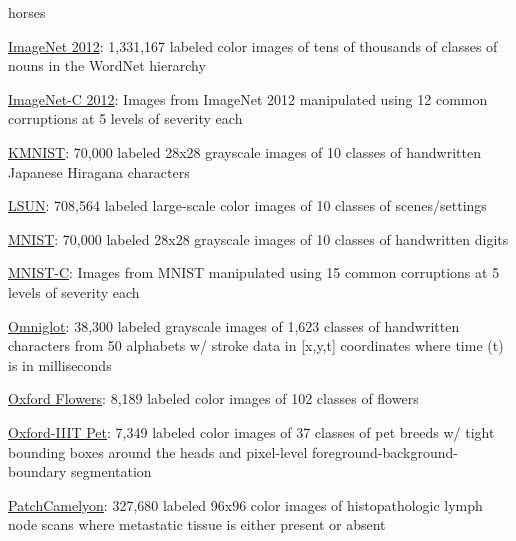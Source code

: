 \documentclass{tufte-handout}
\begin{document}
  horses
\item
  \href{https://github.com/tensorflow/datasets/blob/master/docs/datasets.md\#imagenet2012}{ImageNet
  2012}: 1,331,167 labeled color images of tens of thousands of classes
  of nouns in the WordNet hierarchy
\item
  \href{https://github.com/tensorflow/datasets/blob/master/docs/datasets.md\#imagenet2012_corrupted}{ImageNet-C
  2012}: Images from ImageNet 2012 manipulated using 12 common
  corruptions at 5 levels of severity each
\item
  \href{https://github.com/tensorflow/datasets/blob/master/docs/datasets.md\#kmnist}{KMNIST}:
  70,000 labeled 28x28 grayscale images of 10 classes of handwritten
  Japanese Hiragana characters
\item
  \href{https://github.com/tensorflow/datasets/blob/master/docs/datasets.md\#lsun}{LSUN}:
  708,564 labeled large-scale color images of 10 classes of
  scenes/settings
\item
  \href{https://github.com/tensorflow/datasets/blob/master/docs/datasets.md\#mnist}{MNIST}:
  70,000 labeled 28x28 grayscale images of 10 classes of handwritten
  digits
\item
  \href{https://github.com/tensorflow/datasets/blob/master/docs/datasets.md\#mnist_corrupted}{MNIST-C}:
  Images from MNIST manipulated using 15 common corruptions at 5 levels
  of severity each
\item
  \href{https://github.com/tensorflow/datasets/blob/master/docs/datasets.md\#omniglot}{Omniglot}:
  38,300 labeled grayscale images of 1,623 classes of handwritten
  characters from 50 alphabets w/ stroke data in {[}x,y,t{]} coordinates
  where time (t) is in milliseconds
\item
  \href{https://github.com/tensorflow/datasets/blob/master/docs/datasets.md\#oxford_flowers102}{Oxford
  Flowers}: 8,189 labeled color images of 102 classes of flowers
\item
  \href{https://github.com/tensorflow/datasets/blob/master/docs/datasets.md\#oxford_iiit_pet}{Oxford-IIIT
  Pet}: 7,349 labeled color images of 37 classes of pet breeds w/ tight
  bounding boxes around the heads and pixel-level
  foreground-background-boundary segmentation
\item
  \href{https://github.com/tensorflow/datasets/blob/master/docs/datasets.md\#patch_camelyon}{PatchCamelyon}:
  327,680 labeled 96x96 color images of histopathologic lymph node scans
  where metastatic tissue is either present or absent
\item
\end{document}
